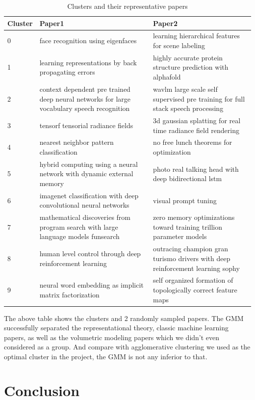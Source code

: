 \documentclass{article}
\begin{document}
\begin{table}
\centering
\begin{tabularx}{\textwidth}{lXX}
\toprule
Cluster & Paper1 & Paper2 \\
\midrule
0 & face recognition using eigenfaces & learning hierarchical features for scene labeling \\
1 & learning representations by back propagating errors & highly accurate protein structure prediction with alphafold \\
2 & context dependent pre trained deep neural networks for large vocabulary speech recognition & wavlm large scale self supervised pre training for full stack speech processing \\
3 & tensorf tensorial radiance fields & 3d gaussian splatting for real time radiance field rendering \\
4 & nearest neighbor pattern classification & no free lunch theorems for optimization \\
5 & hybrid computing using a neural network with dynamic external memory & photo real talking head with deep bidirectional lstm \\
6 & imagenet classification with deep convolutional neural networks & visual prompt tuning \\
7 & mathematical discoveries from program search with large language models funsearch & zero memory optimizations toward training trillion parameter models \\
8 & human level control through deep reinforcement learning & outracing champion gran turismo drivers with deep reinforcement learning sophy \\
9 & neural word embedding as implicit matrix factorization & self organized formation of topologically correct feature maps \\
\bottomrule
\end{tabularx}
\caption{Clusters and their representative papers}
\end{table}

The above table shows the clusters and 2 randomly sampled papers. The GMM successfully separated the representational theory,  classic machine learning papers, as well as the volumetric modeling papers which we didn't even considered as a group. And compare with agglomerative clustering  we used as the optimal cluster in the project, the GMM is not any inferior to that.

\section{Conclusion}
\end{document}
